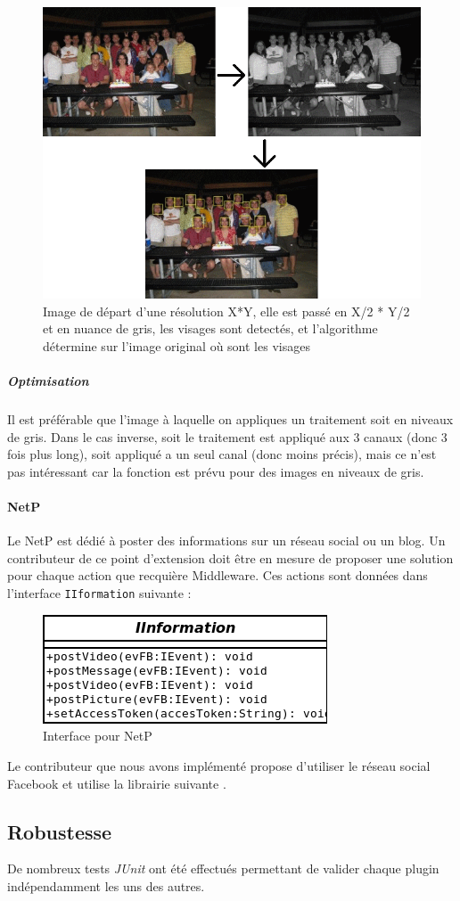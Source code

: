 				\begin{figure}[!h]
					\centering
					\includegraphics[scale=0.50]{img/reasoningVisages.png}
					\caption{Image de départ d'une résolution X*Y, elle est passé en X/2 * Y/2 et en nuance de gris, les visages sont detectés, et l'algorithme détermine sur l'image original où sont les visages}
					\label{divisionRGB}
				\end{figure}
			
			\subparagraph{Optimisation}
				Il est préférable que l'image à laquelle on appliques un traitement soit en niveaux de gris. Dans le cas inverse, soit le traitement est appliqué aux 3 canaux (donc 3 fois plus long), soit appliqué a un seul canal (donc moins précis), mais ce n'est pas intéressant car la fonction est prévu pour des images en niveaux de gris.
		\paragraph{NetP}
			Le  NetP est dédié à poster des informations sur un  réseau social ou un blog. Un contributeur de ce point d'extension doit être en mesure de proposer une solution pour chaque action que recquière Middleware. Ces actions sont données dans l'interface \verb+IIformation+ suivante :
			\begin{figure}[!htbp]
				\centering
				\includegraphics[scale=0.50]{img/iinterface}
				\caption{Interface pour NetP}
				\label{fig:IInterface}
			\end{figure}

			Le contributeur que nous avons implémenté propose d'utiliser le réseau social Facebook et utilise la librairie suivante \cite{restFB}.

\subsection{Robustesse}
	De nombreux tests \emph{JUnit} ont été effectués permettant de valider chaque plugin indépendamment les uns des autres. 
	
